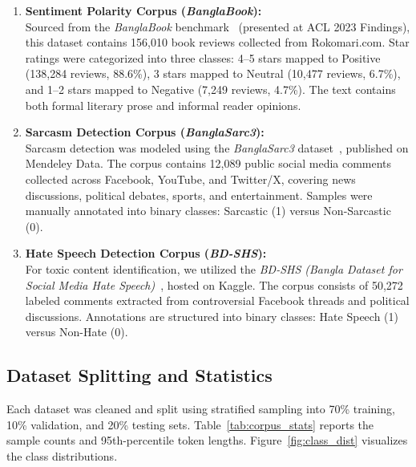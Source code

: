 \documentclass[11pt,a4paper]{article}
\begin{document}
\begin{enumerate}[leftmargin=*]
    \item \textbf{Sentiment Polarity Corpus (\textit{BanglaBook}):} \\
    Sourced from the \textit{BanglaBook} benchmark~\cite{kabir2023banglabook} (presented at ACL 2023 Findings), this dataset contains 156,010 book reviews collected from Rokomari.com. Star ratings were categorized into three classes: 4--5 stars mapped to Positive (138,284 reviews, 88.6\%), 3 stars mapped to Neutral (10,477 reviews, 6.7\%), and 1--2 stars mapped to Negative (7,249 reviews, 4.7\%). The text contains both formal literary prose and informal reader opinions.

    \item \textbf{Sarcasm Detection Corpus (\textit{BanglaSarc3}):} \\
    Sarcasm detection was modeled using the \textit{BanglaSarc3} dataset~\cite{mendeley2023banglasarc3}, published on Mendeley Data. The corpus contains 12,089 public social media comments collected across Facebook, YouTube, and Twitter/X, covering news discussions, political debates, sports, and entertainment. Samples were manually annotated into binary classes: Sarcastic (1) versus Non-Sarcastic (0).

    \item \textbf{Hate Speech Detection Corpus (\textit{BD-SHS}):} \\
    For toxic content identification, we utilized the \textit{BD-SHS (Bangla Dataset for Social Media Hate Speech)}~\cite{romim2021hate}, hosted on Kaggle. The corpus consists of 50,272 labeled comments extracted from controversial Facebook threads and political discussions. Annotations are structured into binary classes: Hate Speech (1) versus Non-Hate (0).
\end{enumerate}

\subsection{Dataset Splitting and Statistics}
Each dataset was cleaned and split using stratified sampling into 70\% training, 10\% validation, and 20\% testing sets. Table~\ref{tab:corpus_stats} reports the sample counts and 95th-percentile token lengths. Figure~\ref{fig:class_dist} visualizes the class distributions.
\end{document}
